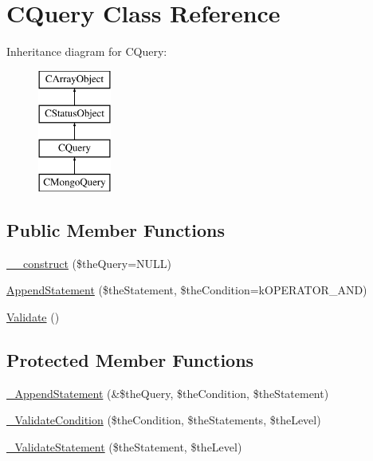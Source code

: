 \hypertarget{class_c_query}{\section{C\-Query Class Reference}
\label{class_c_query}
}
Inheritance diagram for C\-Query\-:\begin{figure}[H]
\begin{center}
\leavevmode
\includegraphics[height=4.000000cm]{class_c_query}
\end{center}
\end{figure}
\subsection*{Public Member Functions}
\begin{DoxyCompactItemize}
\item 
\hyperlink{class_c_query_a5f622c663cffb67955a528cac46502f9}{\-\_\-\-\_\-construct} (\$the\-Query=N\-U\-L\-L)
\item 
\hyperlink{class_c_query_a6cd7ba8e153fc299ba87b614ccb56486}{Append\-Statement} (\$the\-Statement, \$the\-Condition=k\-O\-P\-E\-R\-A\-T\-O\-R\-\_\-\-A\-N\-D)
\item 
\hyperlink{class_c_query_a715ac553707078841213f7b874cbc48e}{Validate} ()
\end{DoxyCompactItemize}
\subsection*{Protected Member Functions}
\begin{DoxyCompactItemize}
\item 
\hyperlink{class_c_query_a1a01d39eedd2951f704dc75c58fb477c}{\-\_\-\-Append\-Statement} (\&\$the\-Query, \$the\-Condition, \$the\-Statement)
\item 
\hyperlink{class_c_query_a5fbde46df4bb30cb252647f0e47cbbde}{\-\_\-\-Validate\-Condition} (\$the\-Condition, \$the\-Statements, \$the\-Level)
\item 
\hyperlink{class_c_query_afe96707c9ed84ee197dae56c9f05f2a4}{\-\_\-\-Validate\-Statement} (\$the\-Statement, \$the\-Level)
\end{DoxyCompactItemize}
